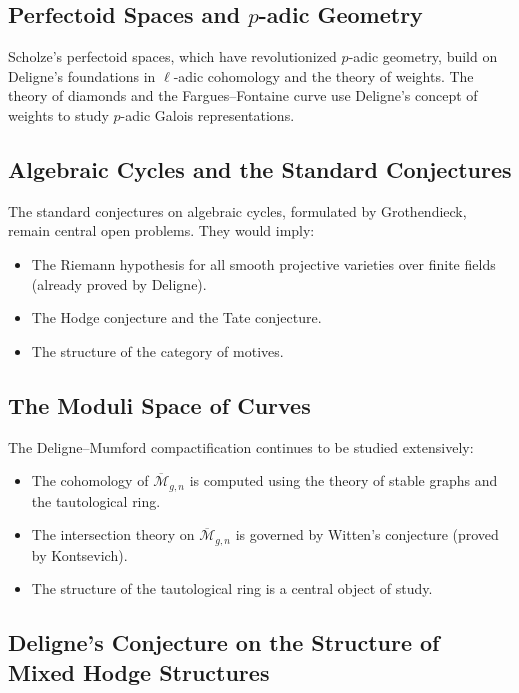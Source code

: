\subsection{Perfectoid Spaces and \texorpdfstring{$p$}{p}-adic Geometry}

Scholze's perfectoid spaces, which have revolutionized $p$-adic geometry, build on Deligne's foundations in $\ell$-adic cohomology and the theory of weights. The theory of diamonds and the Fargues--Fontaine curve use Deligne's concept of weights to study $p$-adic Galois representations.

\subsection{Algebraic Cycles and the Standard Conjectures}

The standard conjectures on algebraic cycles, formulated by Grothendieck, remain central open problems. They would imply:
\begin{itemize}
\item The Riemann hypothesis for all smooth projective varieties over finite fields (already proved by Deligne).
\item The Hodge conjecture and the Tate conjecture.
\item The structure of the category of motives.
\end{itemize}

\subsection{The Moduli Space of Curves}

The Deligne--Mumford compactification continues to be studied extensively:
\begin{itemize}
\item The cohomology of $\overline{\mathcal{M}}_{g,n}$ is computed using the theory of stable graphs and the tautological ring.
\item The intersection theory on $\overline{\mathcal{M}}_{g,n}$ is governed by Witten's conjecture (proved by Kontsevich).
\item The structure of the tautological ring is a central object of study.
\end{itemize}

\subsection{Deligne's Conjecture on the Structure of Mixed Hodge Structures}

